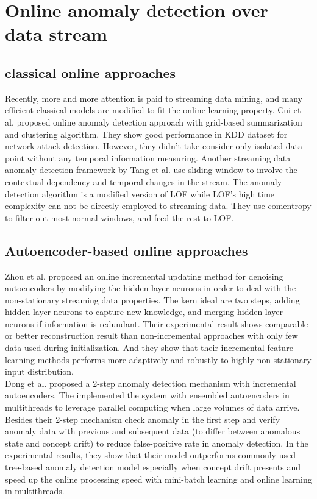 \section{Online anomaly detection over data stream}
\label{sec: Online anomaly detection over data stream }


\subsection{classical online approaches}
\label{sec:classical online approaches}

Recently, more and more attention is paid to streaming data mining, and many efficient classical models are modified to fit the online learning property. Cui et al. \cite{cui} proposed online anomaly detection approach with grid-based summarization and clustering algorithm. They show good performance in KDD dataset for network attack detection. However, they didn’t take consider only isolated data point without any temporal information measuring. Another streaming data anomaly detection framework by Tang et al. \cite{onlinelof} use sliding window to involve the contextual dependency and temporal changes in the stream. The anomaly detection algorithm is a modified version of LOF while LOF’s high time complexity can not be directly employed to streaming data. They use comentropy to filter out most normal windows, and feed the rest to LOF.

\subsection{Autoencoder-based online approaches}
\label{sec:Autoencoder-based online approaches }

Zhou et al. \cite{online} proposed an online incremental updating method for denoising autoencoders by modifying the hidden layer neurons in order to deal with the non-stationary streaming data properties. The kern ideal are two steps, adding hidden layer neurons to capture new knowledge, and merging hidden layer neurons if information is redundant. Their experimental result shows comparable or better reconstruction result than non-incremental approaches with only few data used during initialization. And they show that their incremental feature learning methods performs more adaptively and robustly to highly non-stationary input distribution.\\

Dong et al. \cite{threaded} proposed a 2-step anomaly detection mechanism with incremental autoencoders. The implemented the system with ensembled autoencoders in multithreads to leverage parallel computing when large volumes of data arrive. Besides their 2-step mechanism check anomaly in the first step and verify anomaly data with previous and subsequent data (to differ between anomalous state and concept drift) to reduce false-positive rate in anomaly detection. In the experimental results, they show that their model outperforms commonly used tree-based anomaly detection model especially when concept drift presents and speed up the online processing speed with mini-batch learning and online learning in multithreads.\\

